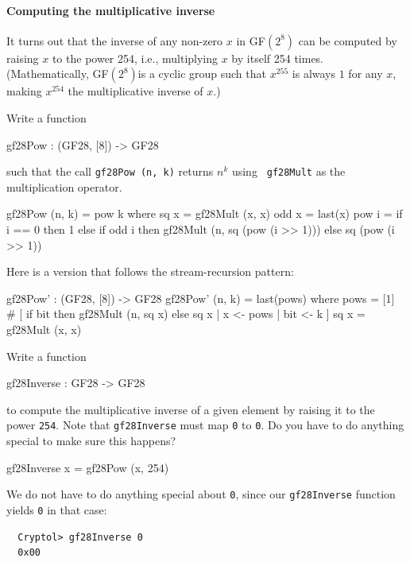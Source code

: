 \paragraph*{Computing the multiplicative inverse} It turns out that the
inverse of any non-zero $x$ in GF$(2^8)$ can be computed by raising
$x$ to the power 254, i.e., multiplying $x$ by itself 254
times. (Mathematically, GF$(2^8)$\indGF is a cyclic group such that
$x^{255}$ is always $1$ for any $x$, making $x^{254}$ the
multiplicative inverse of $x$.)

\begin{Exercise}\label{ex:gfmi:0}
Write a function
\begin{code}
  gf28Pow : (GF28, [8]) -> GF28
\end{code}
such that the call {\tt gf28Pow (n, k)} returns $n^k$ using {\tt
  gf28Mult} as the multiplication operator.  
\end{Exercise}
\begin{Answer}
\begin{code}
  gf28Pow (n, k) = pow k
     where   sq x  = gf28Mult (x, x)
             odd x = last(x)
             pow i = if i == 0 then 1
                     else if odd i
                          then gf28Mult (n, sq (pow (i >> 1)))
                          else sq (pow (i >> 1))
\end{code}
Here is a version that follows the stream-recursion pattern:
\begin{code}
  gf28Pow' : (GF28, [8]) -> GF28
  gf28Pow' (n, k) = last(pows)
    where   pows = [1] # [ if bit then gf28Mult (n, sq x)
                                  else sq x
                         | x <- pows
                         | bit <- k
                         ]
            sq x = gf28Mult (x, x)
\end{code}
\end{Answer}

\begin{Exercise}\label{ex:gfmi:01}
Write a function
\begin{code}
  gf28Inverse : GF28 -> GF28
\end{code}
to compute the multiplicative inverse of a given element by raising it
to the power \texttt{254}. Note that {\tt gf28Inverse} must map \texttt{0} to
\texttt{0}. Do you have to do anything special to make sure this happens?
\end{Exercise}
\begin{Answer}
\begin{code}
  gf28Inverse x = gf28Pow (x, 254)
\end{code}
We do not have to do anything special about \texttt{0}, since our
\texttt{gf28Inverse} function yields \texttt{0} in that case:
\begin{Verbatim}
  Cryptol> gf28Inverse 0
  0x00
\end{Verbatim}
\end{Answer}

